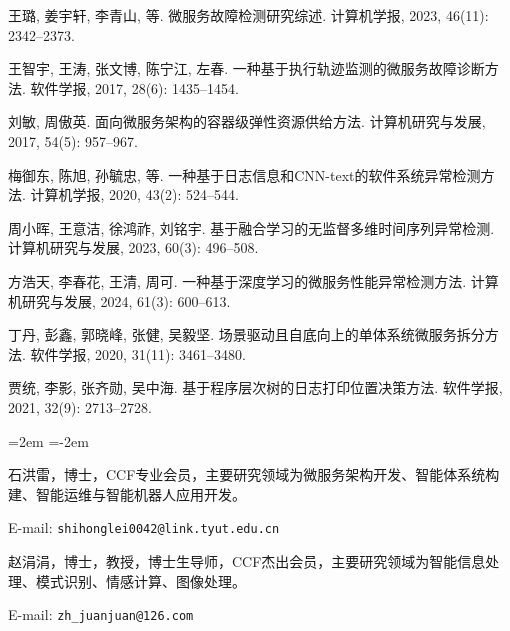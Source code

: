 \documentclass{rjthesis}
\begin{document}
{\begin{description}[font=\normalfont,labelwidth=2em,leftmargin=2.5em,nosep]
\item[{[26]}] 王璐, 姜宇轩, 李青山, 等. 微服务故障检测研究综述. 计算机学报, 2023, 46(11): 2342--2373.
\item[{[27]}] 王智宇, 王涛, 张文博, 陈宁江, 左春. 一种基于执行轨迹监测的微服务故障诊断方法. 软件学报, 2017, 28(6): 1435--1454.
\item[{[32]}] 刘敏, 周傲英. 面向微服务架构的容器级弹性资源供给方法. 计算机研究与发展, 2017, 54(5): 957--967.
\item[{[39]}] 梅御东, 陈旭, 孙毓忠, 等. 一种基于日志信息和CNN-text的软件系统异常检测方法. 计算机学报, 2020, 43(2): 524--544.
\item[{[43]}] 周小晖, 王意洁, 徐鸿祚, 刘铭宇. 基于融合学习的无监督多维时间序列异常检测. 计算机研究与发展, 2023, 60(3): 496--508.
\item[{[44]}] 方浩天, 李春花, 王清, 周可. 一种基于深度学习的微服务性能异常检测方法. 计算机研究与发展, 2024, 61(3): 600--613.
\item[{[48]}] 丁丹, 彭鑫, 郭晓峰, 张健, 吴毅坚. 场景驱动且自底向上的单体系统微服务拆分方法. 软件学报, 2020, 31(11): 3461--3480.
\item[{[49]}] 贾统, 李影, 张齐勋, 吴中海. 基于程序层次树的日志打印位置决策方法. 软件学报, 2021, 32(9): 2713--2728.
\end{description}
}

\vspace{0.5em}

\begingroup
\fontsize{7.5pt}{11.5pt}\selectfont
\begin{list}{}{%
  \leftmargin=2em
  \itemindent=-2em
  \parsep=0pt
  \itemsep=4pt
  \topsep=0pt
}
\item {\hei 石洪雷}，博士，CCF专业会员，主要研究领域为微服务架构开发、智能体系统构建、智能运维与智能机器人应用开发。
\par\noindent E-mail: \nolinkurl{shihonglei0042@link.tyut.edu.cn}
\item {\hei 赵涓涓}，博士，教授，博士生导师，CCF杰出会员，主要研究领域为智能信息处理、模式识别、情感计算、图像处理。
\par\noindent E-mail: \nolinkurl{zh_juanjuan@126.com}
\end{list}
\endgroup
\end{document}
